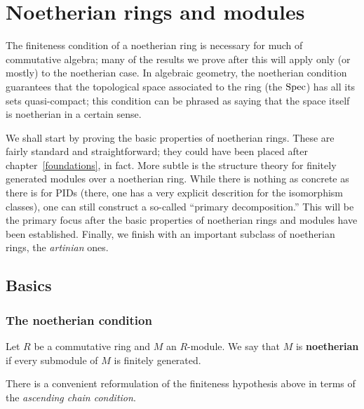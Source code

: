 \chapter{Noetherian rings and modules}
\label{noetherian}

The finiteness condition of a noetherian ring is necessary for much of
commutative algebra; many of the results we prove after this will apply only (or mostly) to the
noetherian case. In algebraic geometry, the noetherian condition guarantees
that the topological space associated to the ring (the $\operatorname{Spec} $) has all its
sets quasi-compact; this condition can be phrased as saying that the space
itself is noetherian in a certain sense. 

We shall start by proving the basic properties of noetherian rings. These are
fairly standard and straightforward; they could have been placed after
chapter~\ref{foundations}, in fact. More subtle is the structure theory for
finitely generated modules over a noetherian ring. While there is nothing as
concrete as there is for PIDs (there, one has a very explicit descrition for
the isomorphism classes), one can still construct a so-called ``primary
decomposition.'' This will be the primary focus after the basic properties of
noetherian rings and modules have been established. Finally, we finish with an
important subclass of noetherian rings, the \emph{artinian} ones.


\section{Basics}

\subsection{The noetherian condition}


\begin{definition} 
Let $R$ be a commutative ring and $M$ an $R$-module. We say that $M$ is
\textbf{noetherian} if every submodule of $M$ is finitely generated.
\end{definition} 


There is a convenient
reformulation of the finiteness hypothesis above in terms of the
\emph{ascending chain condition}.

